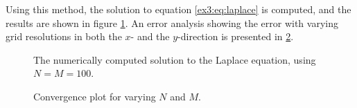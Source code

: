 Using this method, the solution to equation \ref{ex3:eq:laplace} is computed, and the results are shown in figure \ref{ex3:fig:heat_map}.
An error analysis showing the error with varying grid resolutions in both the $x$- and the $y$-direction is presented in \ref{ex3:fig:convergence_plot}.

\begin{figure}[tbp]
    \centering
    \caption{The numerically computed solution to the Laplace equation, using $N = M = 100$.}
    \label{ex3:fig:heat_map}
\end{figure}

\begin{figure}[tbp]
    \centering
    
    \caption{Convergence plot for varying $N$ and $M$.}
    \label{ex3:fig:convergence_plot}
\end{figure}
